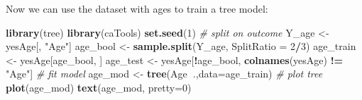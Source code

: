 \documentclass[]{article}
\newenvironment{Shaded}{\begin{snugshade}}{\end{snugshade}}
\newcommand{\KeywordTok}[1]{\textcolor[rgb]{0.13,0.29,0.53}{\textbf{#1}}}
\newcommand{\DataTypeTok}[1]{\textcolor[rgb]{0.13,0.29,0.53}{#1}}
\newcommand{\DecValTok}[1]{\textcolor[rgb]{0.00,0.00,0.81}{#1}}
\newcommand{\StringTok}[1]{\textcolor[rgb]{0.31,0.60,0.02}{#1}}
\newcommand{\CommentTok}[1]{\textcolor[rgb]{0.56,0.35,0.01}{\textit{#1}}}
\newcommand{\OtherTok}[1]{\textcolor[rgb]{0.56,0.35,0.01}{#1}}
\newcommand{\OperatorTok}[1]{\textcolor[rgb]{0.81,0.36,0.00}{\textbf{#1}}}
\newcommand{\NormalTok}[1]{#1}
\begin{document}
\begin{Shaded}
\end{Shaded}

Now we can use the dataset with ages to train a tree model:

\begin{Shaded}
\begin{Highlighting}[]
\KeywordTok{library}\NormalTok{(tree)}
\KeywordTok{library}\NormalTok{(caTools)}
\KeywordTok{set.seed}\NormalTok{(}\DecValTok{1}\NormalTok{) }
\CommentTok{# split on outcome}
\NormalTok{Y_age <-}\StringTok{ }\NormalTok{yesAge[, }\StringTok{"Age"}\NormalTok{]}
\NormalTok{age_bool <-}\StringTok{ }\KeywordTok{sample.split}\NormalTok{(Y_age, }\DataTypeTok{SplitRatio =} \DecValTok{2}\OperatorTok{/}\DecValTok{3}\NormalTok{) }
\NormalTok{age_train <-}\StringTok{ }\NormalTok{yesAge[age_bool, ]}
\NormalTok{age_test <-}\StringTok{ }\NormalTok{yesAge[}\OperatorTok{!}\NormalTok{age_bool, }\KeywordTok{colnames}\NormalTok{(yesAge) }\OperatorTok{!=}\StringTok{ "Age"}\NormalTok{]}
\CommentTok{# fit model}
\NormalTok{age_mod <-}\StringTok{ }\KeywordTok{tree}\NormalTok{(Age}\OperatorTok{~}\NormalTok{.,}\DataTypeTok{data=}\NormalTok{age_train)}
\CommentTok{# plot tree}
\KeywordTok{plot}\NormalTok{(age_mod)}
\KeywordTok{text}\NormalTok{(age_mod, }\DataTypeTok{pretty=}\DecValTok{0}\NormalTok{)}
\end{Highlighting}
\end{Shaded}
\end{document}
